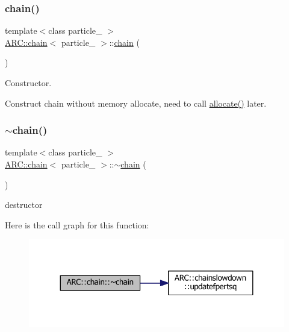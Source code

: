 \subsubsection{\texorpdfstring{chain()}{chain()}\hspace{0.1cm}{\footnotesize\ttfamily [2/2]}}
{\footnotesize\ttfamily template$<$class particle\+\_\+ $>$ \\
\hyperlink{classARC_1_1chain}{A\+R\+C\+::chain}$<$ particle\+\_\+ $>$\+::\hyperlink{classARC_1_1chain}{chain} (\begin{DoxyParamCaption}{ }\end{DoxyParamCaption})\hspace{0.3cm}{\ttfamily [inline]}}



Constructor. 

Construct chain without memory allocate, need to call \hyperlink{classARC_1_1chain_a9ccc3dbc93660e08d78532b64500a0f5}{allocate()} later. \hypertarget{classARC_1_1chain_af83c26f178fd88947cdd53fa4b6cb047}{}\label{classARC_1_1chain_af83c26f178fd88947cdd53fa4b6cb047} 
\subsubsection{\texorpdfstring{$\sim$chain()}{~chain()}}
{\footnotesize\ttfamily template$<$class particle\+\_\+ $>$ \\
\hyperlink{classARC_1_1chain}{A\+R\+C\+::chain}$<$ particle\+\_\+ $>$\+::$\sim$\hyperlink{classARC_1_1chain}{chain} (\begin{DoxyParamCaption}{ }\end{DoxyParamCaption})\hspace{0.3cm}{\ttfamily [inline]}}



destructor 

Here is the call graph for this function\+:
\nopagebreak
\begin{figure}[H]
\begin{center}
\leavevmode
\includegraphics[width=324pt]{classARC_1_1chain_af83c26f178fd88947cdd53fa4b6cb047_cgraph}
\end{center}
\end{figure}


